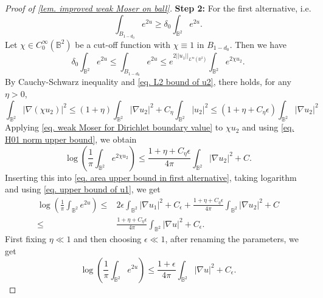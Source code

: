 \documentclass[10pt,a4paper]{amsart}
\begin{document}
\begin{proof}[Proof of \cref{lem. improved weak Moser on ball}]
        {\bf Step 2:} For the first alternative, i.e.
        \[
        \int_{B_{1-d_0}}e^{2u}
        \geq \delta_0\int_{\mathbb{B}^2}e^{2u}.
        \]
        Let $\chi\in C_0^{\infty}(\mathbb{B}^2)$ be a cut-off function with $\chi\equiv 1$ in $B_{1-d_0}$. Then we have
        \begin{equation}\label{eq. area upper bound in first alternative}
            \delta_0 \int_{\mathbb{B}^2}e^{2u}
        \leq \int_{B_{1-d_0}}e^{2u}
        \leq e^{2||u_1||
        _{L^\infty(\mathbb{B}^2)}}
        \int_{\mathbb{B}^2}e^{2\chi u_2}.
        \end{equation}
        By Cauchy-Schwarz inequality and \cref{eq. L2 bound of u2}, there holds, for any $\eta>0$,
        \begin{equation}
        \label{eq. H01 norm upper bound}
            \int_{\mathbb{B}^2}|\nabla(\chi u_2)|^2
        \leq (1+\eta)
        \int_{\mathbb{B}^2}|\nabla u_2|^2
        +C_\eta\int_{\mathbb{B}^2}|u_2|^2
        \leq (1+\eta+C_\eta\epsilon)
        \int_{\mathbb{B}^2}|\nabla u_2|^2
        \end{equation}
        Applying \cref{eq. weak Moser for Dirichlet boundary value} to $\chi u_2$ and using \cref{eq. H01 norm upper bound}, we obtain
        \[
        \log\left(
        \frac{1}{\pi}
        \int_{\mathbb{B}^2}e^{2\chi u_2}
        \right)
        \leq \frac{1+\eta+C_\eta\epsilon}{4\pi}
        \int_{\mathbb{B}^2}|\nabla u_2|^2
        +C.
        \]
        Inserting this into \cref{eq. area upper bound in first alternative}, taking logarithm and using \cref{eq. upper bound of u1}, we get 
        \begin{align*}
            \log\left(
        \frac{1}{\pi}
        \int_{\mathbb{B}^2}e^{2u}
        \right)
        \leq& 2\epsilon\int_{\mathbb{B}^2}
        |\nabla u_1|^2
        +C_\epsilon
        +\frac{1+\eta+C_\eta\epsilon}{4\pi}
        \int_{\mathbb{B}^2}|\nabla u_2|^2
        +C\\
        \leq &\frac{1+\eta+C_\eta\epsilon}{4\pi}
        \int_{\mathbb{B}^2}|\nabla u|^2
        +C_\epsilon.
        \end{align*}
        First fixing $\eta\ll 1$ and then choosing $\epsilon\ll 1$, after renaming the parameters, we get
        \[
        \log\left(
        \frac{1}{\pi}
        \int_{\mathbb{B}^2}e^{2u}
        \right)
        \leq \frac{1+\epsilon}{4\pi}
        \int_{\mathbb{B}^2}|\nabla u|^2
        +C_\epsilon.
        \]    


\end{proof}
\end{document}
